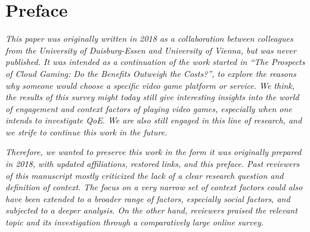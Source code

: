 \section*{Preface}


\textit{This paper was originally written in 2018 as a collaboration between colleagues from the University of Duisburg-Essen and University of Vienna, but was never published. It was intended as a continuation of the work started in ``The Prospects of Cloud Gaming: Do the Benefits Outweigh the Costs?'', to explore the reasons why someone would choose a specific video game platform or service.
We think, the results of this survey might today still give interesting insights into the world of engagement and context factors of playing video games, especially when one intends to investigate QoE. We are also still engaged in this line of research, and we strife to continue this work in the future.} 

\textit{
Therefore, we wanted to preserve this work in the form it was originally prepared in 2018, with updated affiliations, restored links, and this preface. 
Past reviewers of this manuscript mostly criticized the lack of a clear research question and definition of context. The focus on a very narrow set of context factors could also have been extended to a broader range of factors, especially social factors, and subjected to a deeper analysis. On the other hand, reviewers praised the relevant topic and its investigation through a comparatively large online survey.
}

